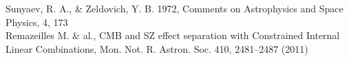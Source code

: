 \documentclass[a4paper,11pt]{article}
\begin{document}
\newpage
\begin{thebibliography}{2}

 Sunyaev, R. A., \& Zeldovich, Y. B. 1972, Comments on
  Astrophysics and Space Physics, 4, 173 \\
  
Remazeilles M. \& al., CMB and SZ effect
  separation with Constrained Internal Linear Combinations, 
  Mon. Not. R. Astron. Soc. 410, 2481–2487 (2011)  \\
  
\end{thebibliography}
\listoffixmes
\end{document}
